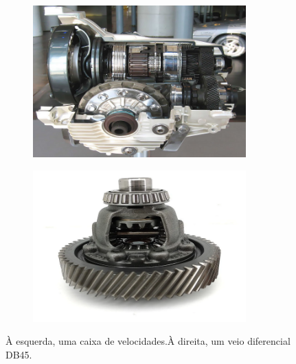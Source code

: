 \begin{figure}[htb]
    \centering
    \begin{subfigure}{.5\textwidth}
        \centering
        \includegraphics[width = 0.9\textwidth]{Figures/Cap2/Caixa_de_velocidades.png}
        \caption{}
        \label{fig:caixa_de_velocidades}
    \end{subfigure}%
    \begin{subfigure}{.5\textwidth}
        \centering
        \includegraphics[width = 0.9\textwidth]{Figures/Cap2/Caixa_diferencial.png}
        \caption{}
        \label{fig:diferencial_montado}
    \end{subfigure}
\caption[Uma caixa de velocidades e uma caixa diferencial]%
{À esquerda, uma caixa de velocidades.À direita, um veio diferencial DB45.}
\end{figure}
\newpage
\par
